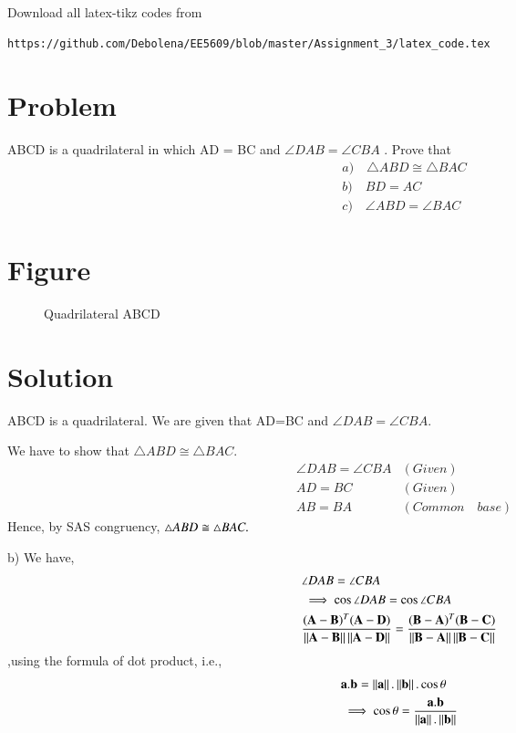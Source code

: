 \documentclass[journal,12pt,twocolumn]{IEEEtran}
\begin{document}
Download all latex-tikz codes from 
%
\begin{lstlisting}
https://github.com/Debolena/EE5609/blob/master/Assignment_3/latex_code.tex
\end{lstlisting}
%
\section{Problem}
ABCD is a quadrilateral in which AD = BC and $\angle{DAB}  = \angle{CBA}$ . Prove that
\begin{align}
& a)  \quad	\triangle ABD \cong \triangle BAC \\
& b)  \quad BD = AC \\ 
& c)  \quad \angle ABD = \angle BAC
\end{align}

\section{Figure}
\begin{figure}[!htb]
	\centering
    \centering
    \resizebox{\columnwidth}{!}{}
	\caption{Quadrilateral ABCD}
\end{figure}

\section{Solution}
ABCD is a quadrilateral.
We are given that AD=BC and $\angle DAB= \angle CBA$.

We have to show that $\triangle ABD \cong \triangle BAC$.
\begin{align}
	& \angle DAB = \angle CBA & (Given) \\
	& AD = BC & (Given) \\
	& AB = BA & (Common \quad base)
\end{align}
Hence, by SAS congruency, $\triangle ABD \cong \triangle BAC.\\$

b) We have,
\begin{align}
 & \angle DAB  =  \angle CBA \\
 &\implies \cos\angle DAB  =  \cos\angle CBA \\
 & \label{eq1} \frac{(\mathbf A -\mathbf B)^T(\mathbf{A}-\mathbf{D})} {\left\lVert\mathbf{A}-\mathbf{B}\right\rVert \left\lVert\mathbf{A}-\mathbf{D}\right\rVert } 
 = \frac{(\mathbf B -\mathbf A)^T(\mathbf{B}-\mathbf{C})} {\left\lVert\mathbf{B}-\mathbf{A}\right\rVert \left\lVert\mathbf{B}-\mathbf{C}\right\rVert}
 \end{align}
,using the formula of dot product, i.e.,
\begin{align}
    &\mathbf{a}.\mathbf{b}=\left\lVert\mathbf{a}\right\rVert. \left\lVert\mathbf{b}\right\rVert. \cos\theta\\
    &\implies \cos\theta = \frac{\mathbf{a}.\mathbf{b}}{\left\lVert\mathbf{a}\right\rVert.\left\lVert\mathbf{b}\right\rVert}
\end{align}
\end{document}
